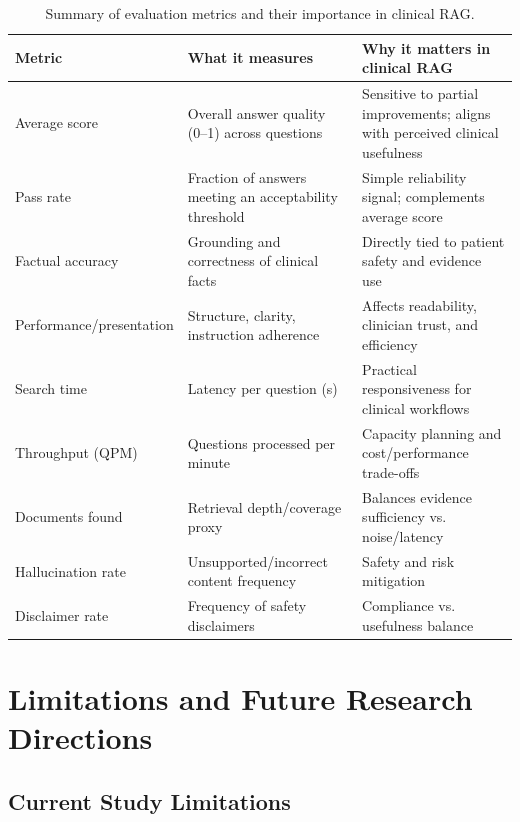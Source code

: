 \begin{table}[h]
\centering
\begin{footnotesize}
\renewcommand\arraystretch{0.95}
\begin{tabularx}{\textwidth}{l X X}
  \toprule
  Metric & What it measures & Why it matters in clinical RAG \\
  \midrule
  Average score & Overall answer quality (0--1) across questions & Sensitive to partial improvements; aligns with perceived clinical usefulness \\[3em]
  Pass rate & Fraction of answers meeting an acceptability threshold & Simple reliability signal; complements average score \\[2em]
  Factual accuracy & Grounding and correctness of clinical facts & Directly tied to patient safety and evidence use \\[2em]
  Performance/presentation & Structure, clarity, instruction adherence & Affects readability, clinician trust, and efficiency \\[2em]
  Search time & Latency per question (s) & Practical responsiveness for clinical workflows \\[2em]
  Throughput (QPM) & Questions processed per minute & Capacity planning and cost/performance trade-offs \\[2em]
  Documents found & Retrieval depth/coverage proxy & Balances evidence sufficiency vs. noise/latency \\[2em]
  Hallucination rate & Unsupported/incorrect content frequency & Safety and risk mitigation \\[2em]
  Disclaimer rate & Frequency of safety disclaimers & Compliance vs. usefulness balance \\[4pt]
  \bottomrule
\end{tabularx}
\end{footnotesize}
\caption{Summary of evaluation metrics and their importance in clinical RAG.}
\label{tab:metrics_summary}
\end{table}

\section{Limitations and Future Research Directions}

\subsection{Current Study Limitations}

